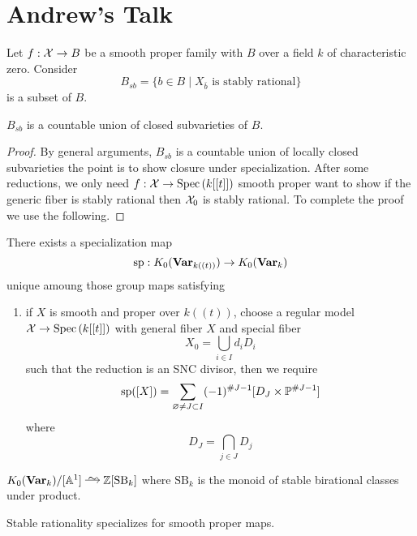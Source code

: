\documentclass[12pt]{article}
\begin{document}
\section{Andrew's Talk}

\renewcommand{\sp}{\mathrm{sp}}

Let $f : \mathcal{X} \to B$ be a smooth proper family with $B$ over a field $k$ of characteristic zero. Consider
\[ B_{sb} = \{ b \in B \mid X_{\bar{b}} \text{ is stably rational} \} \]
is a subset of $B$. 

\begin{theorem}
$B_{sb}$ is a countable union of closed subvarieties of $B$.
\end{theorem}

\begin{proof}
By general arguments, $B_{sb}$ is a countable union of locally closed subvarieties the point is to show closure under specialization. After some reductions, we only need $f : \mathcal{X} \to \mathrm{Spec}\left( k[[t]] \right)$ smooth proper want to show if the generic fiber is stably rational then $\mathcal{X}_0$ is stably rational. To complete the proof we use the following.
\end{proof}

\begin{theorem}
There exists a specialization map
\[ \sp : K_0(\Var_{k((t))}) \to K_0(\Var_k) \]
unique amoung those group maps satisfying
\begin{enumerate}
\item if $X$ is smooth and proper over $k((t))$, choose a regular model $\mathcal{X} \to \mathrm{Spec}\left( k[[t]] \right)$ with general fiber $X$ and special fiber
\[ X_0 = \bigcup_{i \in I} d_i D_i \]
such that the reduction is an SNC divisor, then we require
\[ \sp([X]) = \sum_{\varnothing \neq J \subset I} (-1)^{\# J - 1} [D_J \times \P^{\# J -1}] \]
where
\[ D_J = \bigcap_{j \in J} D_j \]
\end{enumerate}
\end{theorem}

\newcommand{\SB}{\mathrm{SB}}
\newcommand{\Bir}{\mathrm{Bir}}

\begin{theorem}
$K_0(\Var_k) / [\A^1] \iso \Z[\mathrm{SB}_k]$ where $\mathrm{SB}_k$ is the monoid of stable birational classes under product. 
\end{theorem}

\begin{cor}
Stable rationality specializes for smooth proper maps.
\end{cor}
\end{document}
